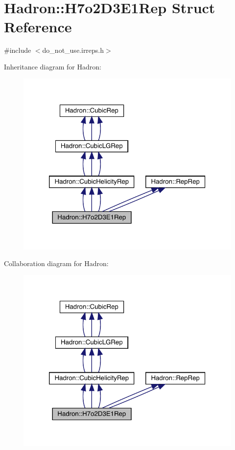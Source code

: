 \hypertarget{structHadron_1_1H7o2D3E1Rep}{}\section{Hadron\+:\+:H7o2\+D3\+E1\+Rep Struct Reference}
\label{structHadron_1_1H7o2D3E1Rep}


{\ttfamily \#include $<$do\+\_\+not\+\_\+use.\+irreps.\+h$>$}



Inheritance diagram for Hadron\+:
\nopagebreak
\begin{figure}[H]
\begin{center}
\leavevmode
\includegraphics[width=320pt]{de/dec/structHadron_1_1H7o2D3E1Rep__inherit__graph}
\end{center}
\end{figure}


Collaboration diagram for Hadron\+:
\nopagebreak
\begin{figure}[H]
\begin{center}
\leavevmode
\includegraphics[width=320pt]{d9/d3f/structHadron_1_1H7o2D3E1Rep__coll__graph}
\end{center}
\end{figure}
